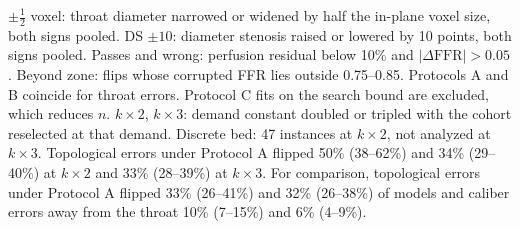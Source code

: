 \documentclass[journal,twoside,web,onecolumn]{ieeecolor}
\begin{document}
\begin{table}[!ht]
\parbox{0.95\textwidth}{\footnotesize $\pm\tfrac12$ voxel: throat diameter narrowed or widened by half the in-plane voxel size, both signs pooled. DS $\pm10$: diameter stenosis raised or lowered by 10 points, both signs pooled. Passes and wrong: perfusion residual below 10\% and $|\Delta\mathrm{FFR}| > 0.05$. Beyond zone: flips whose corrupted FFR lies outside 0.75--0.85. Protocols A and B coincide for throat errors. Protocol C fits on the search bound are excluded, which reduces $n$. $k\times2$, $k\times3$: demand constant doubled or tripled with the cohort reselected at that demand. Discrete bed: 47 instances at $k\times2$, not analyzed at $k\times3$. Topological errors under Protocol A flipped 50\% (38--62\%) and 34\% (29--40\%) at $k\times2$ and 33\% (28--39\%) at $k\times3$. For comparison, topological errors under Protocol A flipped 33\% (26--41\%) and 32\% (26--38\%) of models and caliber errors away from the throat 10\% (7--15\%) and 6\% (4--9\%).}
\end{table}

\FloatBarrier
{}
\end{document}
